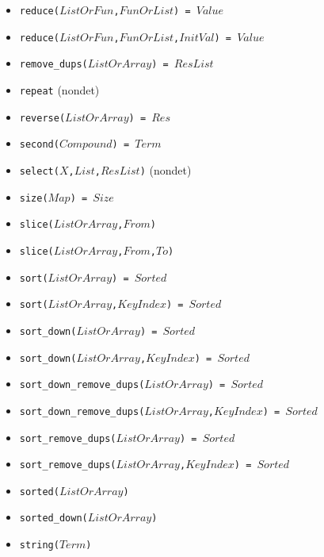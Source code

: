 \documentclass[10pt]{article}
\begin{document}
\begin{multicols}{2}
\begin{scriptsize}
\begin{itemize}
    \item \texttt{reduce($ListOrFun$,$FunOrList$) = $Value$} 
    \item \texttt{reduce($ListOrFun$,$FunOrList$,$InitVal$) = $Value$} 
    \item \texttt{remove\_dups($ListOrArray$) = $ResList$} 
    \item \texttt{repeat} (nondet)
    \item \texttt{reverse($ListOrArray$) = $Res$} 
    \item \texttt{second($Compound$) = $Term$} 
    \item \texttt{select($X$,$List$,$ResList$)} (nondet)
    \item \texttt{size($Map$) = $Size$}
    \item \texttt{slice($ListOrArray$,$From$)}
    \item \texttt{slice($ListOrArray$,$From$,$To$)}
    \item \texttt{sort($ListOrArray$) = $Sorted$} 
    \item \texttt{sort($ListOrArray$,$KeyIndex$) = $Sorted$} 
    \item \texttt{sort\_down($ListOrArray$) = $Sorted$} 
    \item \texttt{sort\_down($ListOrArray$,$KeyIndex$) = $Sorted$} 
    \item \texttt{sort\_down\_remove\_dups($ListOrArray$) = $Sorted$} 
    \item \texttt{sort\_down\_remove\_dups($ListOrArray$,$KeyIndex$) = $Sorted$} 
    \item \texttt{sort\_remove\_dups($ListOrArray$) = $Sorted$} 
    \item \texttt{sort\_remove\_dups($ListOrArray$,$KeyIndex$) = $Sorted$} 
    \item \texttt{sorted($ListOrArray$)} 
    \item \texttt{sorted\_down($ListOrArray$)} 
    \item \texttt{string($Term$)} 

\end{itemize}
\end{scriptsize}
\end{multicols}
\end{document}
